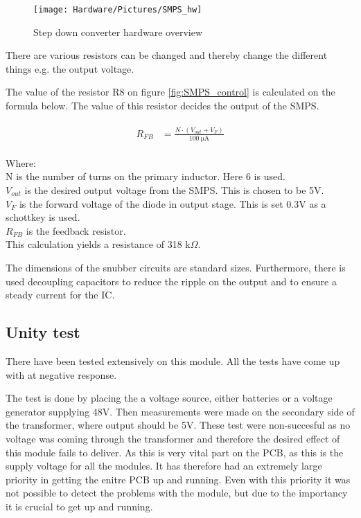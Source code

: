 \begin{figure}[H]
	\centering
	\texttt{[image: Hardware/Pictures/SMPS\_hw]}
	\caption{Step down converter hardware overview}
	\label{fig:SMPS_control}
\end{figure}

There are various resistors can be changed and thereby change the different things e.g. the output voltage. 

The value of the resistor R8 on figure \vref{fig:SMPS_control} is calculated on the formula below. The value of this resistor decides the output of the SMPS.

\begin{align}
	\begin{split}
		R_{FB} &= \frac{N \cdot (V_{out}+V_F)}{\SI{100}{\micro \ampere}}
	\end{split}
\end{align}

Where:\\
N is the number of turns on the primary inductor. Here 6 is used. \\
$V_{out}$ is the desired output voltage from the SMPS. This is chosen to be 5V. \\
$V_F$ is the forward voltage of the diode in output stage. This is set 0.3V as a schottkey is used. \\
$R_{FB}$ is the feedback resistor. \\
This calculation yields a resistance of 318 k$\Omega$.

The dimensions of the snubber circuits are standard sizes. Furthermore, there is used decoupling capacitors to reduce the ripple on the output and to ensure a steady current for the IC.

\subsection{Unity test}
There have been tested extensively on this module. All the tests have come up with at negative response. 

The test is done by placing the a voltage source, either batteries or a voltage generator supplying 48V. Then measurements were made on the secondary side of the transformer, where output should be 5V. These test were non-succesful as no voltage was coming through the transformer and therefore the desired effect of this module fails to deliver. As this is very vital part on the PCB, as this is the supply voltage for all the modules. It has therefore had an extremely large priority in getting the enitre PCB up and running. Even with this priority it was not possible to detect the problems with the module, but due to the importancy it is crucial to get up and running.  